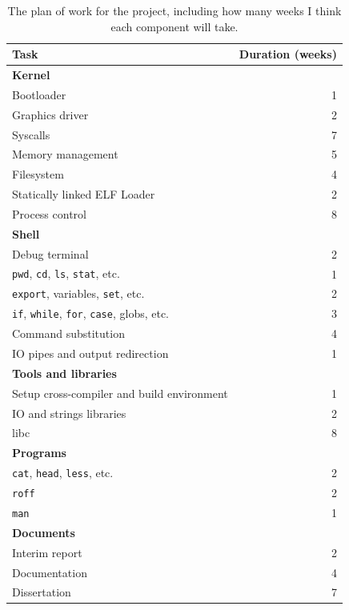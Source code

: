 \documentclass{article}
\begin{document}
\begin{table}[tbp]
\begin{center}
\begin{tabular}{|l|r|}
    \hline
    Task & Duration (weeks) \\
    \hline \textbf{Kernel} & \\
    Bootloader & 1 \\
    Graphics driver & 2 \\
    Syscalls & 7 \\
    Memory management & 5 \\
    Filesystem & 4 \\
    Statically linked ELF Loader & 2 \\
    Process control & 8 \\
    \hline \textbf{Shell} & \\
    Debug terminal & 2 \\
    \texttt{pwd}, \texttt{cd}, \texttt{ls}, \texttt{stat}, etc. & 1 \\
    \texttt{export}, variables, \texttt{set}, etc. & 2 \\
    \texttt{if}, \texttt{while}, \texttt{for}, \texttt{case}, globs, etc. & 3 \\
    Command substitution & 4 \\
    IO pipes and output redirection & 1 \\
    \hline \textbf{Tools and libraries} & \\
    Setup cross-compiler and build environment & 1 \\
    IO and strings libraries & 2 \\
    libc & 8 \\
    \hline \textbf{Programs} & \\
    \texttt{cat}, \texttt{head}, \texttt{less}, etc. & 2 \\
    \texttt{roff} & 2 \\
    \texttt{man} & 1 \\
    \hline \textbf{Documents} & \\
    Interim report & 2 \\
    Documentation & 4 \\
    Dissertation & 7 \\
    \hline
\end{tabular}
\caption{The plan of work for the project, including how many weeks I think
each component will take.}
\label{tab:interim-work-plan}
\end{center}
\end{table}
\end{document}
